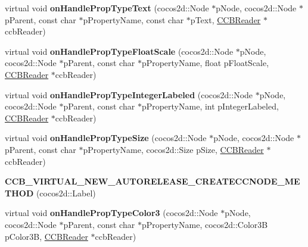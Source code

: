 \begin{DoxyCompactItemize}
\item 
\mbox{\label{classcocosbuilder_1_1LabelTTFLoader_a629a78cf9d843db4a7c9f1b79db57094}} 
virtual void {\bfseries on\+Handle\+Prop\+Type\+Text} (cocos2d\+::\+Node $\ast$p\+Node, cocos2d\+::\+Node $\ast$p\+Parent, const char $\ast$p\+Property\+Name, const char $\ast$p\+Text, \hyperlink{classcocosbuilder_1_1CCBReader}{C\+C\+B\+Reader} $\ast$ccb\+Reader)
\item 
\mbox{\label{classcocosbuilder_1_1LabelTTFLoader_a99c98049e1101a060e061cf56e321d40}} 
virtual void {\bfseries on\+Handle\+Prop\+Type\+Float\+Scale} (cocos2d\+::\+Node $\ast$p\+Node, cocos2d\+::\+Node $\ast$p\+Parent, const char $\ast$p\+Property\+Name, float p\+Float\+Scale, \hyperlink{classcocosbuilder_1_1CCBReader}{C\+C\+B\+Reader} $\ast$ccb\+Reader)
\item 
\mbox{\label{classcocosbuilder_1_1LabelTTFLoader_af9c5c1b7d3b500d1d136d2f65e8abcca}} 
virtual void {\bfseries on\+Handle\+Prop\+Type\+Integer\+Labeled} (cocos2d\+::\+Node $\ast$p\+Node, cocos2d\+::\+Node $\ast$p\+Parent, const char $\ast$p\+Property\+Name, int p\+Integer\+Labeled, \hyperlink{classcocosbuilder_1_1CCBReader}{C\+C\+B\+Reader} $\ast$ccb\+Reader)
\item 
\mbox{\label{classcocosbuilder_1_1LabelTTFLoader_ac1d3a2c9f148c7aecef61811e1f403b4}} 
virtual void {\bfseries on\+Handle\+Prop\+Type\+Size} (cocos2d\+::\+Node $\ast$p\+Node, cocos2d\+::\+Node $\ast$p\+Parent, const char $\ast$p\+Property\+Name, cocos2d\+::\+Size p\+Size, \hyperlink{classcocosbuilder_1_1CCBReader}{C\+C\+B\+Reader} $\ast$ccb\+Reader)
\item 
\mbox{\label{classcocosbuilder_1_1LabelTTFLoader_aceb2c5750bedbb613954a1a1d4eb6f63}} 
{\bfseries C\+C\+B\+\_\+\+V\+I\+R\+T\+U\+A\+L\+\_\+\+N\+E\+W\+\_\+\+A\+U\+T\+O\+R\+E\+L\+E\+A\+S\+E\+\_\+\+C\+R\+E\+A\+T\+E\+C\+C\+N\+O\+D\+E\+\_\+\+M\+E\+T\+H\+OD} (cocos2d\+::\+Label)
\item 
\mbox{\label{classcocosbuilder_1_1LabelTTFLoader_a81674c22e7510dcf4909d3214feef650}} 
virtual void {\bfseries on\+Handle\+Prop\+Type\+Color3} (cocos2d\+::\+Node $\ast$p\+Node, cocos2d\+::\+Node $\ast$p\+Parent, const char $\ast$p\+Property\+Name, cocos2d\+::\+Color3B p\+Color3B, \hyperlink{classcocosbuilder_1_1CCBReader}{C\+C\+B\+Reader} $\ast$ccb\+Reader)

\end{DoxyCompactItemize}
